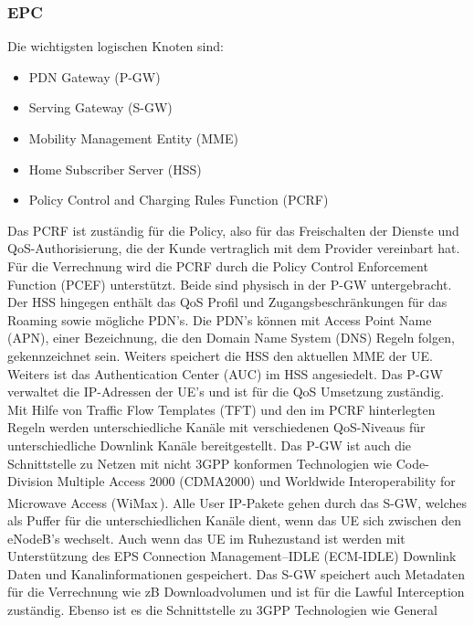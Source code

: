 \subsubsection{EPC}
\label{subsubsec:epc}
Die wichtigsten logischen Knoten sind:
\begin{itemize}
	\item PDN Gateway (P-GW)
	\item Serving Gateway (S-GW)
	\item Mobility Management Entity (MME)
	\item Home Subscriber Server (HSS)
	\item Policy Control and Charging Rules Function (PCRF)
\end{itemize}
Das PCRF ist zuständig für die Policy, also für das Freischalten der Dienste und QoS-Authorisierung, die der Kunde vertraglich mit dem Provider vereinbart hat. Für die Verrechnung wird die PCRF durch die Policy Control Enforcement Function (PCEF) unterstützt. Beide sind physisch in der P-GW untergebracht. Der HSS hingegen enthält das QoS Profil und Zugangsbeschränkungen für das Roaming sowie mögliche PDN's. Die PDN's können mit Access Point Name (APN), einer Bezeichnung, die den Domain Name System (DNS) Regeln folgen, gekennzeichnet sein. Weiters speichert die HSS den aktuellen MME der UE. Weiters ist das Authentication Center (AUC) im HSS angesiedelt. Das P-GW verwaltet die IP-Adressen der UE's und ist für die QoS Umsetzung zuständig. Mit Hilfe von Traffic Flow Templates (TFT) und den im PCRF hinterlegten Regeln werden unterschiedliche Kanäle mit verschiedenen QoS-Niveaus für unterschiedliche Downlink Kanäle bereitgestellt. Das P-GW ist auch die Schnittstelle zu Netzen mit nicht 3GPP konformen Technologien wie Code-Division Multiple Access 2000 (CDMA2000) und Worldwide Interoperability for Microwave Access (WiMax\,\textsuperscript{\tiny\textregistered}). Alle User IP-Pakete gehen durch das S-GW, welches als Puffer für die unterschiedlichen Kanäle dient, wenn das UE sich zwischen den eNodeB's wechselt. Auch wenn das UE im Ruhezustand ist werden mit Unterstützung des EPS Connection Management--IDLE (ECM-IDLE)  Downlink Daten und Kanalinformationen gespeichert. Das S-GW speichert auch Metadaten für die Verrechnung wie zB Downloadvolumen und ist für die Lawful Interception zuständig. Ebenso ist es die Schnittstelle zu 3GPP Technologien wie General
